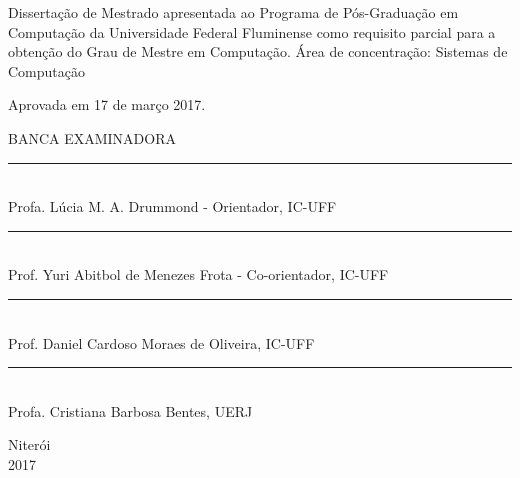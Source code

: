 \noindent
\begin{flushright}
\begin{minipage}[t]{8cm}

Dissertação de Mestrado apresentada ao Programa de Pós-Graduação em Computação da Universidade Federal Fluminense como requisito parcial para a obtenção do Grau de Mestre em Computação. Área de concentração: Sistemas de Computação %

\end{minipage}
\end{flushright}
\vspace{1.0 cm}
\noindent
Aprovada em 17 de março 2017. \\
\begin{flushright}
  \parbox{11cm}
  {
  \begin{center}
  BANCA EXAMINADORA \\
  \vspace{6mm}
  \rule{11cm}{.1mm} \\
    Profa. Lúcia M. A. Drummond - Orientador, IC-UFF \\
    \vspace{6mm}
  \rule{11cm}{.1mm} \\
    Prof. Yuri Abitbol de Menezes Frota - Co-orientador, IC-UFF \\
    \vspace{6mm}
  \rule{11cm}{.1mm} \\
    Prof. Daniel Cardoso Moraes de Oliveira, IC-UFF\\
    \vspace{6mm}
  \rule{11cm}{.1mm} \\
    Profa. Cristiana Barbosa Bentes, UERJ\\
  \vspace{6mm}
  \end{center}
  }
\end{flushright}
\begin{center}
  \vspace{4mm}
  Niter\'{o}i \\
  2017

\end{center}

\cleardoublepage
\thispagestyle{empty}
\vspace*{200mm}

